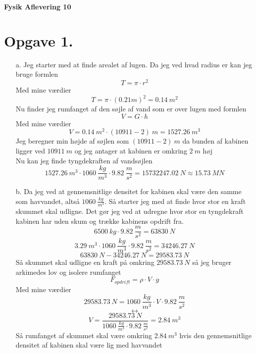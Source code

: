 \documentclass[12pt]{article}
\begin{document}
\Large{\textbf{Fysik Aflevering 10}}
\normalsize

\section*{Opgave 1.}
\begin{enumerate}
  \item[a.] Jeg starter med at finde arealet af lugen. Da jeg ved hvad radius er kan jeg bruge formlen
  $$T = \pi \cdot r^2$$
  Med mine værdier
  $$T = \pi \cdot (0.21 m)^2 = 0.14 \ m^2$$
  Nu finder jeg rumfanget af den søjle af vand som er over lugen med formlen
  $$V = G \cdot h$$
  Med mine værdier
  $$V = 0.14 \ m^2 \cdot (10911-2) \ m = 1527.26 \ m^3$$
  Jeg beregner min højde af søjlen som $(10911-2) \ m$ da bunden af kabinen ligger ved $10911 \ m$ og jeg antager at kabinen er omkring $2 \ m$ høj\\
  Nu kan jeg finde tyngdekraften af vandsøjlen
  $$1527.26 \ m^3 \cdot 1060 \ \frac{kg}{m^3} \cdot 9.82 \ \frac{m}{s^2} = 15732247.02 \ N \approx 15.73 \ MN$$

  \item[b.] Da jeg ved at gennemsnitlige densitet for kabinen skal være den samme som havvandet, altså $1060 \ \frac{kg}{m^3}$.
  Så starter jeg med at finde hvor stor en kraft skummet skal udligne.
  Det gør jeg ved at udregne hvor stor en tyngdekraft kabinen har uden skum og trække kabinens opdrift fra.
  $$6500 \ kg \cdot 9.82 \ \frac{m}{s^2} = 63830 \ N$$
  $$3.29 \ m^3 \cdot 1060 \ \frac{kg}{m^3} \cdot 9.82 \ \frac{m}{s^2} = 34246.27 \ N$$
  $$63830 \ N - 34246.27 \ N = 29583.73 \ N$$
  Så skummet skal udligne en kraft på omkring $29583.73 \ N$ så jeg bruger arkimedes lov og isolere rumfanget
  $$F_{opdrift} = \rho \cdot V \cdot g$$
  Med mine værdier
  $$29583.73 \ N = 1060 \ \frac{kg}{m^3} \cdot V \cdot 9.82 \ \frac{m}{s^2} $$
  $$\leftrightarrow $$
  $$ V = \frac{29583.73 \ N}{1060 \ \frac{kg}{m^3} \cdot 9.82 \ \frac{m}{s^2}} = 2.84 \ m^3$$
  Så rumfanget af skummet skal være omkring $2.84 \ m^3$ hvis den gennemsnitlige densitet af kabinen skal være lig med havvandet
\end{enumerate}
\end{document}
